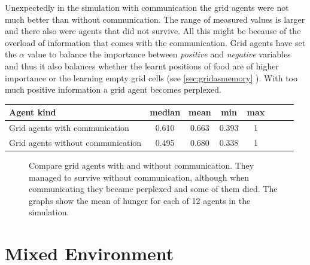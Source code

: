 Unexpectedly in the simulation with communication the grid agents were not much better than without communication. The range of measured values is larger and there also were agents that did not survive. All this might be because of the overload of information that comes with the communication. Grid agents have set the $\alpha$ value to balance the importance between \emph{positive} and \emph{negative} variables and thus it also balances whether the learnt positions of food are of higher importance or the learning empty grid cells (see \ref{sec:gridasmemory} ). With too much positive information a grid agent becomes perplexed.


\begin{center}   
  \begin{tabular}{l*{6}{c}r}
  Agent kind        & median & mean & min & max \\
  \hline  
  Grid agents with communication        & 0.610 & 0.663 & 0.393 & 1 \\
  Grid agents without communication        & 0.495 & 0.680 & 0.338 & 1 \\
  \end{tabular}                  
\end{center}



\begin{figure}[h!]
  \centering        
  \caption{Compare grid agents with and without communication. They managed to survive without communication, although when communicating they became perplexed and some of them died. The graphs show the mean of hunger for each of 12 agents in the simulation.}           
  \label{experiments:gng}  
\end{figure} 

\clearpage

\section{Mixed Environment}
                        
